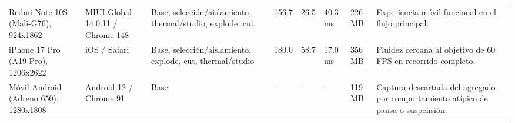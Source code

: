 \begin{table}[H]
\begin{tabular}{p{2.5cm}p{2.1cm}p{2.65cm}p{0.9cm}p{1.05cm}p{1.25cm}p{1.1cm}p{2.15cm}}
        Redmi Note 10S (Mali-G76), 924x1862 & MIUI Global 14.0.11 / Chrome 148 & Base, selección/aislamiento, thermal/studio, explode, cut & 156.7 & 26.5 & 40.3 ms & 226 MB & Experiencia móvil funcional en el flujo principal. \\
        iPhone 17 Pro (A19 Pro), 1206x2622 & iOS / Safari & Base, selección/aislamiento, explode, cut, thermal/studio & 180.0 & 58.7 & 17.0 ms & 356 MB & Fluidez cercana al objetivo de 60 FPS en recorrido completo. \\
        Móvil Android (Adreno 650), 1280x1808 & Android 12 / Chrome 91 & Base & -- & -- & -- & 119 MB & Captura descartada del agregado por comportamiento atípico de pausa o suspensión. \\ \hline
    \end{tabular}
    \par\vspace{0.5\baselineskip}
\end{table}

